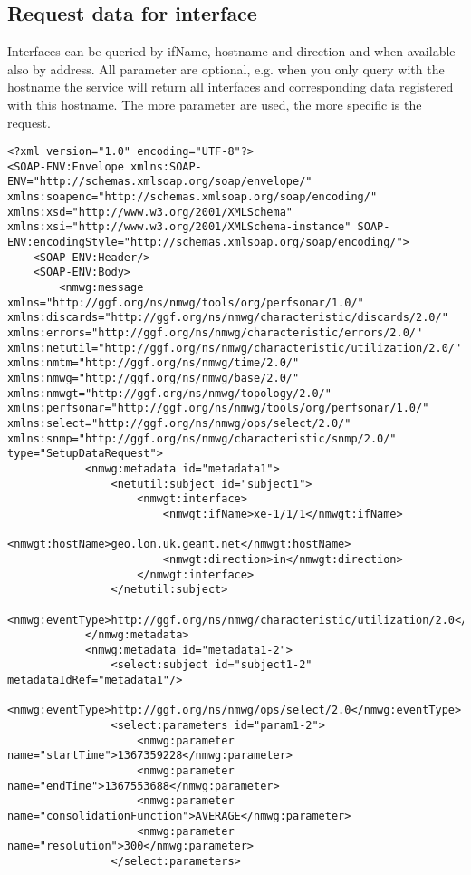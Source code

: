 \documentclass[a4paper,12pt,titlepage,hidelinks,fleqn]{article}
\begin{document}
\subsection{Request data for interface}
\begin{flushleft}
Interfaces can be queried by ifName, hostname and direction and when available also by address. All parameter are optional, e.g. when you only query with the hostname the service will return all interfaces and corresponding data registered with this hostname. The more parameter are used, the more specific is the request.
\begin{framed}
\begin{lstlisting}
<?xml version="1.0" encoding="UTF-8"?>
<SOAP-ENV:Envelope xmlns:SOAP-ENV="http://schemas.xmlsoap.org/soap/envelope/" xmlns:soapenc="http://schemas.xmlsoap.org/soap/encoding/" xmlns:xsd="http://www.w3.org/2001/XMLSchema" xmlns:xsi="http://www.w3.org/2001/XMLSchema-instance" SOAP-ENV:encodingStyle="http://schemas.xmlsoap.org/soap/encoding/">
	<SOAP-ENV:Header/>
	<SOAP-ENV:Body>
		<nmwg:message xmlns="http://ggf.org/ns/nmwg/tools/org/perfsonar/1.0/" xmlns:discards="http://ggf.org/ns/nmwg/characteristic/discards/2.0/" xmlns:errors="http://ggf.org/ns/nmwg/characteristic/errors/2.0/" xmlns:netutil="http://ggf.org/ns/nmwg/characteristic/utilization/2.0/" xmlns:nmtm="http://ggf.org/ns/nmwg/time/2.0/" xmlns:nmwg="http://ggf.org/ns/nmwg/base/2.0/" xmlns:nmwgt="http://ggf.org/ns/nmwg/topology/2.0/" xmlns:perfsonar="http://ggf.org/ns/nmwg/tools/org/perfsonar/1.0/" xmlns:select="http://ggf.org/ns/nmwg/ops/select/2.0/" xmlns:snmp="http://ggf.org/ns/nmwg/characteristic/snmp/2.0/" type="SetupDataRequest">
			<nmwg:metadata id="metadata1">
				<netutil:subject id="subject1">
					<nmwgt:interface>
						<nmwgt:ifName>xe-1/1/1</nmwgt:ifName>
						<nmwgt:hostName>geo.lon.uk.geant.net</nmwgt:hostName>
						<nmwgt:direction>in</nmwgt:direction>
					</nmwgt:interface>
				</netutil:subject>
				<nmwg:eventType>http://ggf.org/ns/nmwg/characteristic/utilization/2.0</nmwg:eventType>
			</nmwg:metadata>
			<nmwg:metadata id="metadata1-2">
				<select:subject id="subject1-2" metadataIdRef="metadata1"/>
				<nmwg:eventType>http://ggf.org/ns/nmwg/ops/select/2.0</nmwg:eventType>
				<select:parameters id="param1-2">
					<nmwg:parameter name="startTime">1367359228</nmwg:parameter>
					<nmwg:parameter name="endTime">1367553688</nmwg:parameter>
					<nmwg:parameter name="consolidationFunction">AVERAGE</nmwg:parameter>
					<nmwg:parameter name="resolution">300</nmwg:parameter>
				</select:parameters>

\end{lstlisting}
\end{framed}
\end{flushleft}
\end{document}
